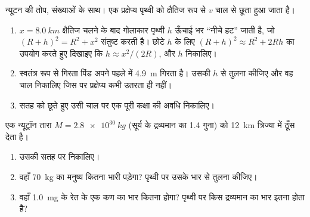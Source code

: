 \begin{exercise}[$\star\star\star$]\label{exo:g10:universal-gravitation:13}
न्यूटन की तोप, संख्याओं के साथ। एक प्रक्षेप्य पृथ्वी को क्षैतिज रूप से
$v$ चाल से छूता हुआ जाता है।
\begin{enumerate}
  \item $x = \qty{8.0}{km}$ क्षैतिज चलने के बाद गोलाकार पृथ्वी $h$ ऊँचाई भर
        ``नीचे हट'' जाती है, जो $(R + h)^2 = R^2 + x^2$ संतुष्ट करती है। छोटे $h$
        के लिए $(R + h)^2 \approx R^2 + 2Rh$ का उपयोग करते हुए दिखाइए कि $h \approx x^2 / (2R)$, और $h$
        निकालिए।
  \item स्वतंत्र रूप से गिरता पिंड अपने पहले  में \qty{4.9}{m} गिरता
        है। उसकी $h$ से तुलना कीजिए और वह चाल निकालिए जिस पर
        प्रक्षेप्य कभी उतरता ही नहीं।
  \item सतह को छूते हुए उसी चाल पर एक पूरी कक्षा की अवधि
        निकालिए।
\end{enumerate}
\end{exercise}

\begin{exercise}[$\star\star\star$]\label{exo:g10:universal-gravitation:14}
एक न्यूट्रॉन तारा $M = \qty{2.8e30}{kg}$ (सूर्य के द्रव्यमान का 1.4 गुना) को \qty{12}{km}
त्रिज्या में ठूँस देता है।
\begin{enumerate}
  \item उसकी सतह पर  निकालिए।
  \item वहाँ \qty{70}{kg} का मनुष्य कितना भारी पड़ेगा? पृथ्वी पर उसके
        भार से तुलना कीजिए।
  \item वहाँ \qty{1.0}{mg} के रेत के एक कण का भार कितना होगा? पृथ्वी
        पर किस द्रव्यमान का भार इतना होता है?
\end{enumerate}
\end{exercise}

